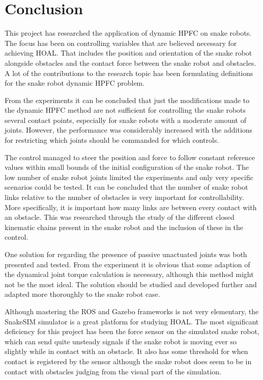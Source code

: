\chapter{Conclusion}\label{ch:conclusion}

This project has researched the application of dynamic HPFC on snake robots. The focus has been on controlling variables that are believed necessary for achieving HOAL. That includes the position and orientation of the snake robot alongside obstacles and the contact force between the snake robot and obstacles. A lot of the contributions to the research topic has been formulating definitions for the snake robot dynamic HPFC problem.

From the experiments it can be concluded that just the modifications made to the dynamic HPFC method are not sufficient for controlling the snake robots several contact points, especially for snake robots with a moderate amount of joints. However, the performance was considerably increased with the additions for restricting which joints should be commanded for which controls.

The control managed to steer the position and force to follow constant reference values within small bounds of the initial configuration of the snake robot. The low number of snake robot joints limited the experiments and only very specific scenarios could be tested. It can be concluded that the number of snake robot links relative to the number of obstacles is very important for controllability. More specifically, it is important how many links are between every contact with an obstacle. This was researched through the study of the different closed kinematic chains present in the snake robot and the inclusion of these in the control.

One solution for regarding the presence of passive unactuated joints was both presented and tested. From the experiment it is obvious that some adaption of the dynamical joint torque calculation is necessary, although this method might not be the most ideal. The solution should be studied and developed further and adapted more thoroughly to the snake robot case.

Although mastering the ROS and Gazebo frameworks is not very elementary, the SnakeSIM simulator is a great platform for studying HOAL. The most significant deficiency for this project has been the force sensor on the simulated snake robot, which can send quite unsteady signals if the snake robot is moving ever so slightly while in contact with an obstacle. It also has some threshold for when contact is registered by the sensor although the snake robot does seem to be in contact with obstacles judging from the visual part of the simulation.

